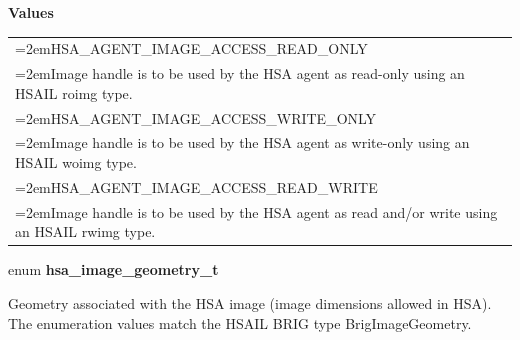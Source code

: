 \documentclass{book}
\newcommand{\hsadef}[2]{\hypertarget{#1}{\textbf{#2}}}
\begin{document}
\begin{appendices}
\noindent\textbf{Values}\\[-5mm]
\begin{longtable}{@{}>{\hangindent=2em}p{\linewidth}}
HSA\_AGENT\_IMAGE\_ACCESS\_READ\_ONLY \\\hspace{2em}Image handle is to be used by the HSA agent as read-only using an HSAIL roimg type.\\[2mm]
HSA\_AGENT\_IMAGE\_ACCESS\_WRITE\_ONLY \\\hspace{2em}Image handle is to be used by the HSA agent as write-only using an HSAIL woimg type.\\[2mm]
HSA\_AGENT\_IMAGE\_ACCESS\_READ\_WRITE \\\hspace{2em}Image handle is to be used by the HSA agent as read and/or write using an HSAIL rwimg type.
\end{longtable}

\noindent\begin{tcolorbox}[nobeforeafter,arc=0mm,colframe=white,colback=lightgray,left=0mm]
enum \hsadef{group__images_1ga31e40ddc0666f01a0821a9bc37ca514b}{hsa\_image\_geometry\_t}
\end{tcolorbox}
Geometry associated with the HSA image (image dimensions allowed in HSA). The enumeration values match the HSAIL BRIG type BrigImageGeometry.


\end{appendices}
\end{document}
